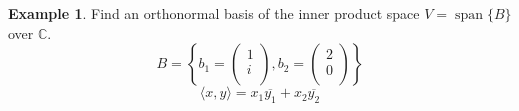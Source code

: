 \documentclass[fleqn, a4paper, 12pt]{article}
\theoremstyle{definition}
\newtheorem{example}{Example}
\theoremstyle{theorem}
\DeclareMathOperator{\vspan}{\mathrm{span}} %
\begin{document}
\begin{example}
	Find an orthonormal basis of the inner product space $V = \vspan\{B\}$ over $\mathbb{C}$.
	\begin{equation*}
		B =
			\left\lbrace
				b_1 = 
					\begin{pmatrix}
						1\\
						i\\
					\end{pmatrix}
				,
				b_2 = 
					\begin{pmatrix}
						2\\
						0\\
					\end{pmatrix}
			\right\rbrace
	\end{equation*}
	\begin{equation*}
		\langle x, y \rangle = x_1 \overline{y_1} + x_2 \overline{y_2}
	\end{equation*}
\end{example}
\end{document}
